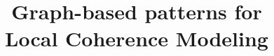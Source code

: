 \title{Graph-based patterns for \\ Local Coherence Modeling}

\publishers{{\normalsize vorgelegt von} \\ Mohsen Mesgar}
 
\date{} 

\titlehead{Inauguraldissertation zur Erlangung der Doktorwürde der Neuphilologischen Fakultät der Ruprecht-Karls-Universität Heidelberg} 

\lowertitleback{Referent: Prof.\ Dr.\ Michael Strube\\Korreferent: Prof.\ Dr.\ \\Einreichung: June 2018}



